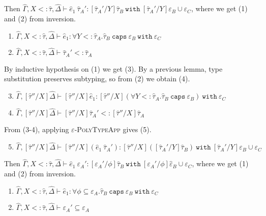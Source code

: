 \documentclass{llncs}
\newcommand{\keywadj}[1]{\mathtt{#1}}
\newcommand{\keyw}[1]{\keywadj{#1}~}
\newcommand{\kw}[1]{\keyw{ #1 }}
\begin{document}
 Then $\hat \Gamma, X <: \hat \tau, \hat \Delta \vdash \hat e_1~\hat \tau_A': [\hat \tau_A'/Y]\hat \tau_B~\kw{with} [\hat \tau_A'/Y]\varepsilon_B \cup \varepsilon_C$, where we get (1) and (2) from inversion.

\begin{enumerate}
	\item $\hat \Gamma, X <: \hat \tau, \hat \Delta \vdash \hat e_1: \forall Y <: \hat \tau_A. \hat \tau_B~\kw{caps} \varepsilon_B~\kw{with} \varepsilon_C$
	\item $\hat \Gamma, X <: \hat \tau, \hat \Delta \vdash \hat \tau_A' <: \hat \tau_A$
\end{enumerate}

By inductive hypothesis on (1) we get (3). By a previous lemma, type substitution preserves subtyping, so from (2) we obtain (4).

\begin{enumerate}
	
	\setcounter{enumi}{2}
	\item $\hat \Gamma, [\hat \tau''/X]\hat \Delta \vdash [\hat \tau''/X]\hat e_1: [\hat \tau''/X](\forall Y <: \hat \tau_A. \hat \tau_B~\kw{caps} \varepsilon_B)~\kw{with} \varepsilon_C$
	\item $\hat \Gamma, [\hat \tau''/X]\hat \Delta \vdash [\hat \tau''/X]\hat \tau_A' <: [\hat \tau''/X]\hat \tau_A$
	
\end{enumerate}

From (3-4), applying \textsc{$\varepsilon$-PolyTypeApp} gives (5).

\begin{enumerate}
	\setcounter{enumi}{4}
	\item $\hat \Gamma, [\hat \tau''/X]\hat \Delta \vdash [\hat \tau''/X](\hat e_1~\hat \tau_A'): [\hat \tau''/X]([\hat \tau_A'/Y]\hat \tau_B)~\kw{with} [\hat \tau_A'/Y]\varepsilon_B \cup \varepsilon_C$
\end{enumerate}

 Then $\hat \Gamma, X <: \hat \tau, \hat \Delta \vdash \hat e_1~\varepsilon_A': [\varepsilon_A'/\phi]\hat \tau_B~\kw{with} [\varepsilon_A'/\phi]\hat \varepsilon_B \cup \varepsilon_C$, where we get (1) and (2) from inversion.

\begin{enumerate}
	\item $\hat \Gamma, X <: \hat \tau, \hat \Delta \vdash \hat e_1: \forall \phi \subseteq \varepsilon_A. \hat \tau_B~\kw{caps} \varepsilon_B~\kw{with} \varepsilon_C$
	\item $\hat \Gamma, X <: \hat \tau, \hat \Delta \vdash \varepsilon_A' \subseteq \varepsilon_A$
\end{enumerate}
\end{document}
